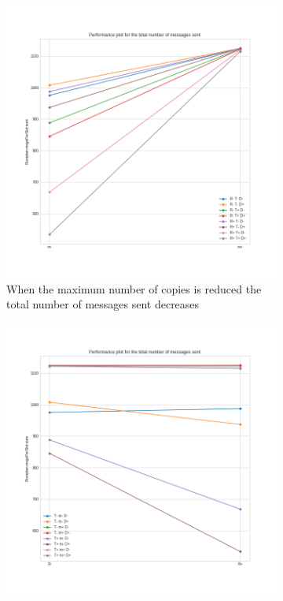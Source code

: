 \begin{figure}[htb]
	\centering
	\begin{subfigure}[b]{0.38\textwidth}
		\centering
		\includegraphics[width=\textwidth]{img/hd/messages-m-perfplot}
		\caption{When the maximum number of copies is reduced the total
		number of messages sent decreases}\label{subfig:hdperfmessagesm}
	\end{subfigure}
	\begin{subfigure}[b]{0.38\textwidth}
		\centering
		\includegraphics[width=\textwidth]{img/hd/messages-R-perfplot}

\end{subfigure}
\end{figure}
